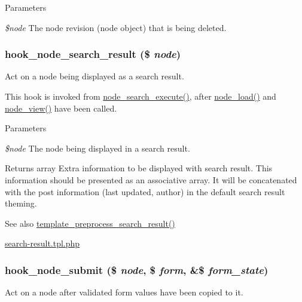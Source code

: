\begin{DoxyParams}{Parameters}
\item[{\em \$node}]The node revision (node object) that is being deleted. \end{DoxyParams}
\hypertarget{group__node__api__hooks_ga8644320a0e04e3a503c99626d4223725}{
\subsubsection[{hook\_\-node\_\-search\_\-result}]{\setlength{\rightskip}{0pt plus 5cm}hook\_\-node\_\-search\_\-result (\$ {\em node})}}
\label{group__node__api__hooks_ga8644320a0e04e3a503c99626d4223725}
Act on a node being displayed as a search result.

This hook is invoked from \hyperlink{node_8module_ad7047dcdd1c1934351adb73de080c640}{node\_\-search\_\-execute()}, after \hyperlink{node_8module_a492ddfc12843e71242bb484a44e51a19}{node\_\-load()} and \hyperlink{node_8module_ac2c64fdfacc25be79a6ecf406ab62320}{node\_\-view()} have been called.


\begin{DoxyParams}{Parameters}
\item[{\em \$node}]The node being displayed in a search result.\end{DoxyParams}
\begin{DoxyReturn}{Returns}
array Extra information to be displayed with search result. This information should be presented as an associative array. It will be concatenated with the post information (last updated, author) in the default search result theming.
\end{DoxyReturn}
\begin{DoxySeeAlso}{See also}
\hyperlink{search_8pages_8inc_a45d5ee9444aba311056f3949e503b426}{template\_\-preprocess\_\-search\_\-result()} 

\hyperlink{search-result_8tpl_8php}{search-\/result.tpl.php} 
\end{DoxySeeAlso}
\hypertarget{group__node__api__hooks_ga1b479b731ecb3f9eec0c92e3e1a8e01d}{
\subsubsection[{hook\_\-node\_\-submit}]{\setlength{\rightskip}{0pt plus 5cm}hook\_\-node\_\-submit (\$ {\em node}, \/  \$ {\em form}, \/  \&\$ {\em form\_\-state})}}
\label{group__node__api__hooks_ga1b479b731ecb3f9eec0c92e3e1a8e01d}
Act on a node after validated form values have been copied to it.

